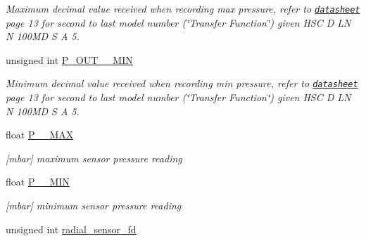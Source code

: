 \begin{DoxyCompactItemize}
\begin{DoxyCompactList}\small\item\em Maximum decimal value received when recording max pressure, refer to \href{http://sensing.honeywell.com/honeywell-sensing-trustability-hsc-series-high-accuracy-board-mount-pressure-sensors-50099148-a-en.pdf}{\tt datasheet} page 13 for second to last model number (\char`\"{}\-Transfer Function\char`\"{}) given H\-S\-C D L\-N N 100\-M\-D S A 5. \end{DoxyCompactList}\item 
\hypertarget{structSPI__data_a9ceacc1af63c3628f794e93a71ea2126}{unsigned int \hyperlink{structSPI__data_a9ceacc1af63c3628f794e93a71ea2126}{P\-\_\-\-O\-U\-T\-\_\-\-\_\-\-M\-I\-N}}\label{structSPI__data_a9ceacc1af63c3628f794e93a71ea2126}

\begin{DoxyCompactList}\small\item\em Minimum decimal value received when recording min pressure, refer to \href{http://sensing.honeywell.com/honeywell-sensing-trustability-hsc-series-high-accuracy-board-mount-pressure-sensors-50099148-a-en.pdf}{\tt datasheet} page 13 for second to last model number (\char`\"{}\-Transfer Function\char`\"{}) given H\-S\-C D L\-N N 100\-M\-D S A 5. \end{DoxyCompactList}\item 
\hypertarget{structSPI__data_a634b17223c7720d100d159ea751d0ec9}{float \hyperlink{structSPI__data_a634b17223c7720d100d159ea751d0ec9}{P\-\_\-\-\_\-\-M\-A\-X}}\label{structSPI__data_a634b17223c7720d100d159ea751d0ec9}

\begin{DoxyCompactList}\small\item\em \mbox{[}mbar\mbox{]} maximum sensor pressure reading \end{DoxyCompactList}\item 
\hypertarget{structSPI__data_af33e94cc7303e19d8324916a596ff14c}{float \hyperlink{structSPI__data_af33e94cc7303e19d8324916a596ff14c}{P\-\_\-\-\_\-\-M\-I\-N}}\label{structSPI__data_af33e94cc7303e19d8324916a596ff14c}

\begin{DoxyCompactList}\small\item\em \mbox{[}mbar\mbox{]} minimum sensor pressure reading \end{DoxyCompactList}\item 
\hypertarget{structSPI__data_a8813b11d25bd5c4d31bd8945e2c1d33a}{unsigned int \hyperlink{structSPI__data_a8813b11d25bd5c4d31bd8945e2c1d33a}{radial\-\_\-sensor\-\_\-fd}}\label{structSPI__data_a8813b11d25bd5c4d31bd8945e2c1d33a}


\end{DoxyCompactItemize}
